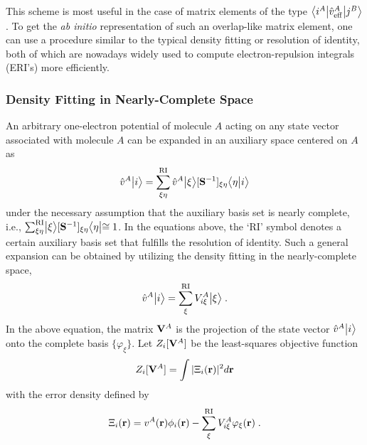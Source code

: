 This scheme is most useful in the case of matrix elements of the type
$
 \tBraKet{i^A}{\hat{v}_{\rm eff}^A}{j^B}
$.
To get the \emph{ab initio} representation of such an overlap\hyp{}like matrix element,
one can use a procedure similar to
the typical density fitting or resolution of identity, both of which are nowadays widely used 
to compute electron\hyp{}repulsion integrals (ERI's) more efficiently. 

\subsubsection{Density Fitting in Nearly-Complete Space}

An arbitrary one\hyp{}electron potential of molecule $A$ acting on any state vector 
associated with molecule $A$ can be expanded in an auxiliary space centered 
on $A$ as
%
\begin{equation}
   \hat{v}^{A}\Ket{i} = \sum_{\xi\eta}^{\rm RI} \hat{v}^{A}\Ket{\xi} [{\bf S}^{-1}]_{\xi\eta} \BraKet{\eta}{i}
\end{equation}
%
under the necessary assumption that the auxiliary basis set is nearly complete,
i.e., 
$\sum_{\xi\eta}^{\rm RI} \Ket{\xi}[{\bf S}^{-1}]_{\xi\eta} \Bra{\eta} \cong 1$.
In the equations above, 
the `RI' symbol denotes a certain auxiliary basis set that fulfills the resolution of identity. 
Such a general expansion can be obtained by 
utilizing the density fitting
in the nearly\hyp{}complete space,
%
\begin{equation}
 \hat{v}^{A}\Ket{i} = \sum_{\xi}^{\rm RI} V^A_{i\xi} \Ket{\xi} \;.
\end{equation}
%
In the above equation,
the matrix ${\bf V}^A$
is the projection of the state vector $\hat{v}^{A} \Ket{i}$
onto the complete basis $\{ \varphi_\xi \}$.
Let $Z_i[{\bf V}^A]$ be the least\hyp{}squares objective function 
%
\begin{equation} \label{e:z-compl}
 Z_i[{\bf V}^A] = \int \vert \Xi_i({\bf r}) \vert^2 d{\bf r}
\end{equation}
%
with the error density defined by
%
\begin{equation}
 \Xi_i({\bf r}) = v^A({\bf r}) \phi_i({\bf r}) - \sum_\xi^{\rm RI} V^A_{i\xi} \varphi_\xi({\bf r}) \;.
\end{equation}
